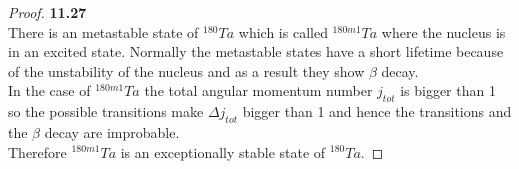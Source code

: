 \documentclass[11pt]{article}
\theoremstyle{definition}
\begin{document}
\cleardoublepage
\begin{proof}{\textbf{11.27}}\\
There is an metastable state of ${}^{180}Ta$ which is called ${}^{180m1}Ta$ where
the nucleus is in an excited state. Normally the metastable states have 
a short lifetime because of the unstability of the nucleus and as a result
they show $\beta$ decay.\\
In the case of ${}^{180m1}Ta$ the total angular momentum number $j_{tot}$ is
bigger than 1 so the possible transitions make $\Delta j_{tot}$ bigger than 1
and hence the transitions and the $\beta$ decay are improbable.\\
Therefore ${}^{180m1}Ta$ is an exceptionally stable state of ${}^{180}Ta$.
\end{proof}

\cleardoublepage
\end{document}

